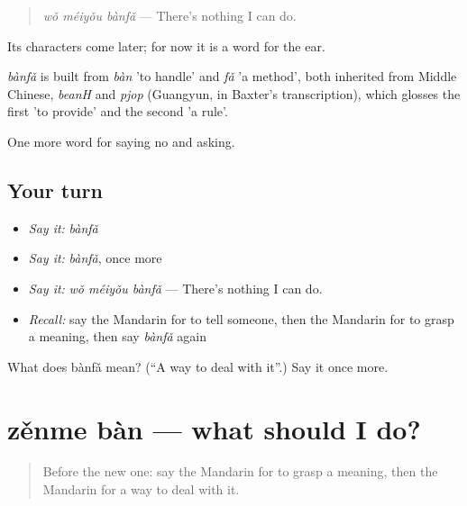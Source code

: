 \begin{quote}
\emph{wǒ méiyǒu bànfǎ} — There's nothing I can do.
\end{quote}

Its characters come later; for now it is a word for the ear.

\begin{cousinweb}
\emph{bànfǎ} is built from \emph{bàn} 'to handle' and \emph{fǎ} 'a method', both inherited from Middle Chinese, \emph{beanH} and \emph{pjop} (Guangyun, in Baxter's transcription), which glosses the first 'to provide' and the second 'a rule'.
\end{cousinweb}

\begin{grammarlens}[title={What you've built}]
One more word for saying no and asking.
\end{grammarlens}

\subsection*{Your turn}
\begin{itemize}
\raggedright
  \item \emph{Say it:} \emph{bànfǎ}
  \item \emph{Say it:} \emph{bànfǎ}, once more
  \item \emph{Say it:} \emph{wǒ méiyǒu bànfǎ} — There's nothing I can do.
  \item \emph{Recall:} say the Mandarin for to tell someone, then the Mandarin for to grasp a meaning, then say \emph{bànfǎ} again
\end{itemize}

\begin{tcolorbox}[breakable,colback=teal!4,colframe=teal!35!black,title={Before you move on}]
What does bànfǎ mean? (\textquotedblleft{}A way to deal with it\textquotedblright{}.) Say it once more.
\end{tcolorbox}
\section[zěnme bàn]{zěnme bàn — what should I do?}

\label{lesson:ZH-C214-zenmeban}



\begin{quote}
Before the new one: say the Mandarin for to grasp a meaning, then the Mandarin for a way to deal with it.
\end{quote}

